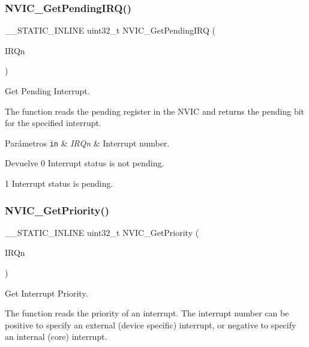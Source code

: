 \subsubsection{\texorpdfstring{N\+V\+I\+C\+\_\+\+Get\+Pending\+I\+R\+Q()}{NVIC\_GetPendingIRQ()}}
{\footnotesize\ttfamily \+\_\+\+\_\+\+S\+T\+A\+T\+I\+C\+\_\+\+I\+N\+L\+I\+NE uint32\+\_\+t N\+V\+I\+C\+\_\+\+Get\+Pending\+I\+RQ (\begin{DoxyParamCaption}\item[{I\+R\+Qn\+\_\+\+Type}]{I\+R\+Qn }\end{DoxyParamCaption})}



Get Pending Interrupt. 

The function reads the pending register in the N\+V\+IC and returns the pending bit for the specified interrupt.


\begin{DoxyParams}[1]{Parámetros}
\mbox{\tt in}  & {\em I\+R\+Qn} & Interrupt number.\\
\hline
\end{DoxyParams}
\begin{DoxyReturn}{Devuelve}
0 Interrupt status is not pending. 

1 Interrupt status is pending. 
\end{DoxyReturn}
\mbox{\label{group___c_m_s_i_s___core___n_v_i_c_functions_ga1cbaf8e6abd4aa4885828e7f24fcfeb4}} 
\subsubsection{\texorpdfstring{N\+V\+I\+C\+\_\+\+Get\+Priority()}{NVIC\_GetPriority()}}
{\footnotesize\ttfamily \+\_\+\+\_\+\+S\+T\+A\+T\+I\+C\+\_\+\+I\+N\+L\+I\+NE uint32\+\_\+t N\+V\+I\+C\+\_\+\+Get\+Priority (\begin{DoxyParamCaption}\item[{I\+R\+Qn\+\_\+\+Type}]{I\+R\+Qn }\end{DoxyParamCaption})}



Get Interrupt Priority. 

The function reads the priority of an interrupt. The interrupt number can be positive to specify an external (device specific) interrupt, or negative to specify an internal (core) interrupt.


